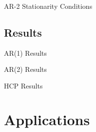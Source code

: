 \documentclass[12pt]{beamer}
\begin{document}
\begin{frame}{AR-2 Stationarity Conditions}
\centering
{}
\end{frame}

\subsection{Results}
\begin{frame}{AR(1) Results}
\end{frame}

\begin{frame}{AR(2) Results}
\end{frame}

\begin{frame}{HCP Results}
\end{frame}

\section{Applications}

\end{document}
